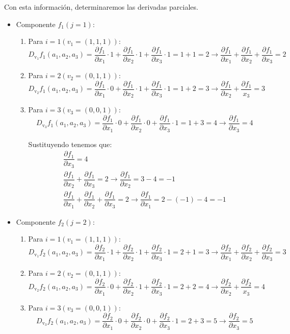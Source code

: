 \begin{enumerate}[label=\color{red}\textbf{\arabic*)}, leftmargin=*]
Con esta información, determinaremos las derivadas parciales.

\begin{itemize}
\item Componente $f_1(j=1):$
\begin{enumerate}[label=\arabic*)]
	\item Para $i=1(v_1=(1,1,1))$: \[ D_{\mathrm{v}_1}f_1(a_1,a_2,a_3)=\dfrac{\partial f_1}{\partial x_1}\cdot 1+\dfrac{\partial f_1}{\partial x_2}\cdot 1+\dfrac{\partial f_1}{\partial x_3}\cdot 1=1+1=2\longrightarrow\dfrac{\partial f_1}{\partial x_1}+\dfrac{\partial f_1}{\partial x_2}+\dfrac{\partial f_1}{\partial x_3}=2 \]
	\item Para $i=2(v_2=(0,1,1))$: \[ D_{\mathrm{v}_2}f_1(a_1,a_2,a_3)=\dfrac{\partial f_1}{\partial x_1}\cdot 0+\dfrac{\partial f_1}{\partial x_2}\cdot 1+\dfrac{\partial f_1}{\partial x_3}\cdot 1=1+2=3\longrightarrow\dfrac{\partial f_1}{\partial x_2}+\dfrac{\partial f_1}{x_3}=3 \]
	\item Para $i=3(v_3=(0,0,1))$: \[ D_{\mathrm{v}_3}f_1(a_1,a_2,a_3)=\dfrac{\partial f_1}{\partial x_1}\cdot 0+\dfrac{\partial f_1}{\partial x_2}\cdot 0+\dfrac{\partial f_1}{\partial x_3}\cdot 1=1+3=4\longrightarrow \dfrac{\partial f_1}{\partial x_3}=4 \]
	
	Sustituyendo tenemos que: \[ \begin{array}{l}
	\dfrac{\partial f_1}{\partial x_3}=4\\
	\dfrac{\partial f_1}{\partial x_2}+\dfrac{\partial f_1}{\partial x_3}=2\longrightarrow \dfrac{\partial f_1}{\partial x_2}=3-4=-1\\
	\dfrac{\partial f_1}{\partial x_1}+\dfrac{\partial f_1}{\partial x_2}+\dfrac{\partial f_1}{\partial x_3}=2\longrightarrow \dfrac{\partial f_1}{\partial x_1}=2-(-1)-4=-1
	\end{array} \]
\end{enumerate}
\item Componente $f_2(j=2)$: 
\begin{enumerate}[label=\arabic*)]
	\item Para $i=1(v_1=(1,1,1))$: \[ D_{\mathrm{v}_1}f_2(a_1,a_2,a_3)=\dfrac{\partial f_2}{\partial x_1}\cdot 1+\dfrac{\partial f_2}{\partial x_2}\cdot 1+\dfrac{\partial f_2}{\partial x_3}\cdot 1=2+1=3\longrightarrow\dfrac{\partial f_2}{\partial x_1}+\dfrac{\partial f_2}{\partial x_2}+\dfrac{\partial f_2}{\partial x_3}=3 \]
	\item Para $i=2(v_2=(0,1,1))$: \[ D_{\mathrm{v}_2}f_2(a_1,a_2,a_3)=\dfrac{\partial f_2}{\partial x_1}\cdot 0+\dfrac{\partial f_2}{\partial x_2}\cdot 1+\dfrac{\partial f_2}{\partial x_3}\cdot 1=2+2=4\longrightarrow\dfrac{\partial f_2}{\partial x_2}+\dfrac{\partial f_2}{x_3}=4 \]
	\item Para $i=3(v_3=(0,0,1))$: \[ D_{\mathrm{v}_3}f_2(a_1,a_2,a_3)=\dfrac{\partial f_2}{\partial x_1}\cdot 0+\dfrac{\partial f_2}{\partial x_2}\cdot 0+\dfrac{\partial f_2}{\partial x_3}\cdot 1=2+3=5\longrightarrow \dfrac{\partial f_2}{\partial x_3}=5 \]
	

\end{enumerate}
\end{itemize}
\end{enumerate}
